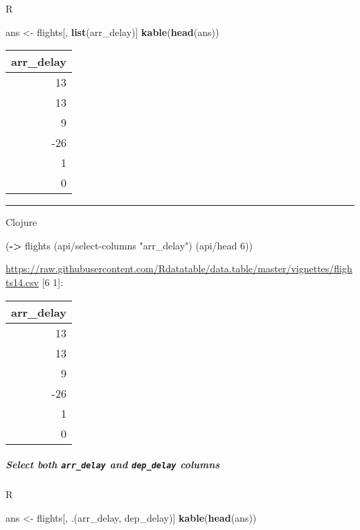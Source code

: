 \documentclass[]{article}
\newenvironment{Shaded}{\begin{snugshade}}{\end{snugshade}}
\newcommand{\KeywordTok}[1]{\textcolor[rgb]{0.13,0.29,0.53}{\textbf{#1}}}
\newcommand{\DecValTok}[1]{\textcolor[rgb]{0.00,0.00,0.81}{#1}}
\newcommand{\StringTok}[1]{\textcolor[rgb]{0.31,0.60,0.02}{#1}}
\newcommand{\NormalTok}[1]{#1}
\let\oldsubparagraph\subparagraph
\renewcommand{\subparagraph}[1]{\oldsubparagraph{#1}\mbox{}}
\begin{document}
R

\begin{Shaded}
\begin{Highlighting}[]
\NormalTok{ans <-}\StringTok{ }\NormalTok{flights[, }\KeywordTok{list}\NormalTok{(arr_delay)]}
\KeywordTok{kable}\NormalTok{(}\KeywordTok{head}\NormalTok{(ans))}
\end{Highlighting}
\end{Shaded}

\begin{longtable}[]{@{}r@{}}
\toprule
arr\_delay\tabularnewline
\midrule
\endhead
13\tabularnewline
13\tabularnewline
9\tabularnewline
-26\tabularnewline
1\tabularnewline
0\tabularnewline
\bottomrule
\end{longtable}

\begin{center}\rule{0.5\linewidth}{0.5pt}\end{center}

Clojure

\begin{Shaded}
\begin{Highlighting}[]
\NormalTok{(}\KeywordTok{->}\NormalTok{ flights}
\NormalTok{    (api/select-columns }\StringTok{"arr_delay"}\NormalTok{)}
\NormalTok{    (api/head }\DecValTok{6}\NormalTok{))}
\end{Highlighting}
\end{Shaded}

\url{https://raw.githubusercontent.com/Rdatatable/data.table/master/vignettes/flights14.csv}
{[}6 1{]}:

\begin{longtable}[]{@{}r@{}}
\toprule
arr\_delay\tabularnewline
\midrule
\endhead
13\tabularnewline
13\tabularnewline
9\tabularnewline
-26\tabularnewline
1\tabularnewline
0\tabularnewline
\bottomrule
\end{longtable}

\subparagraph{\texorpdfstring{Select both \texttt{arr\_delay} and
\texttt{dep\_delay}
columns}{Select both arr\_delay and dep\_delay columns}}\label{select-both-arr_delay-and-dep_delay-columns}

R

\begin{Shaded}
\begin{Highlighting}[]
\NormalTok{ans <-}\StringTok{ }\NormalTok{flights[, .(arr_delay, dep_delay)]}
\KeywordTok{kable}\NormalTok{(}\KeywordTok{head}\NormalTok{(ans))}
\end{Highlighting}
\end{Shaded}
\end{document}
